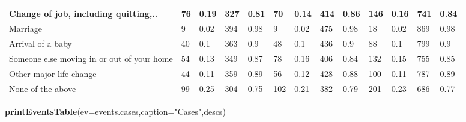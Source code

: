 \documentclass[]{article}
\newenvironment{Shaded}{\begin{snugshade}}{\end{snugshade}}
\newcommand{\DataTypeTok}[1]{\textcolor[rgb]{0.13,0.29,0.53}{#1}}
\newcommand{\KeywordTok}[1]{\textcolor[rgb]{0.13,0.29,0.53}{\textbf{#1}}}
\newcommand{\NormalTok}[1]{#1}
\newcommand{\StringTok}[1]{\textcolor[rgb]{0.31,0.60,0.02}{#1}}
\begin{document}
\begin{table}[t]
\begin{tabular}{l|l|l|l|l|l|l|l|l|l|l|l|l}
\hline
Change of job, including quitting,.. & 76 & 0.19 & 327 & 0.81 & 70 & 0.14 & 414 & 0.86 & 146 & 0.16 & 741 & 0.84\\
\hline
Marriage & 9 & 0.02 & 394 & 0.98 & 9 & 0.02 & 475 & 0.98 & 18 & 0.02 & 869 & 0.98\\
\hline
Arrival of a baby & 40 & 0.1 & 363 & 0.9 & 48 & 0.1 & 436 & 0.9 & 88 & 0.1 & 799 & 0.9\\
\hline
Someone else moving in or out of your home & 54 & 0.13 & 349 & 0.87 & 78 & 0.16 & 406 & 0.84 & 132 & 0.15 & 755 & 0.85\\
\hline
Other major life change & 44 & 0.11 & 359 & 0.89 & 56 & 0.12 & 428 & 0.88 & 100 & 0.11 & 787 & 0.89\\
\hline
None of the above & 99 & 0.25 & 304 & 0.75 & 102 & 0.21 & 382 & 0.79 & 201 & 0.23 & 686 & 0.77\\
\hline
\end{tabular}
\end{table}

\begin{Shaded}
\begin{Highlighting}[]
\KeywordTok{printEventsTable}\NormalTok{(}\DataTypeTok{ev=}\NormalTok{events.cases,}\DataTypeTok{caption=}\StringTok{"Cases"}\NormalTok{,descs)}
\end{Highlighting}
\end{Shaded}
\end{document}
